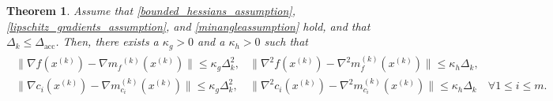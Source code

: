 \documentclass{article}
\newtheorem{theorem}{Theorem}[section]
\theoremstyle{case}
\newcommand{\dacc}{{\Delta_{\text{acc}}}}
\newcommand{\dk}{\Delta_k}
\newcommand{\gmcik}{{\nabla m_{c_i}^{(k)}\left(\xk\right)}}
\newcommand{\gradf}{\nabla f}
\newcommand{\hk}{{\nabla^2m_f^{(k)}(x^{(k)})}}
\newcommand{\mfk}{{{m}_f}^{(k)}}
\newcommand{\xk}{{x^{(k)}}}
\begin{document}
\begin{theorem}
\label{accuracy_is_satisfied}
Assume that \cref{bounded_hessians_assumption}, \cref{lipschitz_gradients_assumption}, and \cref{minangleassumption} hold, and that $\dk \le \dacc$.
Then, there exists a $\kappa_g>0$ and a $\kappa_h>0$ such that
\begin{align*}
\begin{array}{ccc}
\|\gradf(\xk) - \nabla \mfk(\xk) \| \le \kappa_g \dk^2, & \|\nabla^2 f(\xk) - \hk \| \le \kappa_h \dk, & \\
\|\nabla c_i(\xk) - \gmcik \| \le \kappa_g \dk^2, & \|\nabla^2 c_i(\xk) - \nabla^2 m_{c_i}^{(k)}(\xk) \| \le \kappa_h \dk & \forall 1 \le i \le m. \\
\end{array}
\end{align*}
\end{theorem}
\end{document}
